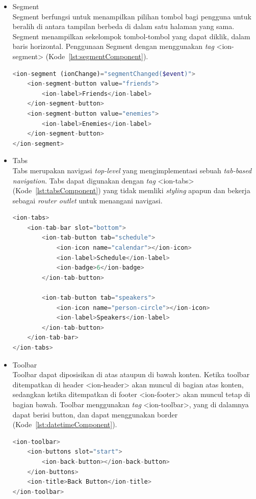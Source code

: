 \begin{itemize}
	\item Segment \\
	Segment berfungsi untuk menampilkan pilihan tombol bagi pengguna untuk beralih di antara tampilan berbeda di dalam satu halaman yang sama. Segment menampilkan sekelompok tombol-tombol yang dapat diklik, dalam baris horizontal. Penggunaan Segment dengan menggunakan {\it tag} <ion-segment> (Kode~\ref{lst:segmentComponent}).
	\begin{lstlisting}[language=php, label={lst:segmentComponent}, caption=Kode Program dari Segment]
<ion-segment (ionChange)="segmentChanged($event)">
	<ion-segment-button value="friends">
		<ion-label>Friends</ion-label>
	</ion-segment-button>
	<ion-segment-button value="enemies">
		<ion-label>Enemies</ion-label>
	</ion-segment-button>
</ion-segment>
	\end{lstlisting}
	
	\item Tabs \\
	Tabs merupakan navigasi {\it top-level} yang mengimplementasi sebuah {\it tab-based navigation}. Tabs dapat digunakan dengan {\it tag} <ion-tabs> (Kode~\ref{lst:tabsComponent}) yang tidak memliki {\it styling} apapun dan bekerja sebagai {\it router outlet} untuk menangani navigasi. 
		\begin{lstlisting}[language=php, label={lst:tabsComponent}, caption=Kode Program dari Tabs]
<ion-tabs>
	<ion-tab-bar slot="bottom">
		<ion-tab-button tab="schedule">
			<ion-icon name="calendar"></ion-icon>
			<ion-label>Schedule</ion-label>
			<ion-badge>6</ion-badge>
		</ion-tab-button>

		<ion-tab-button tab="speakers">
			<ion-icon name="person-circle"></ion-icon>
			<ion-label>Speakers</ion-label>
		</ion-tab-button>
	</ion-tab-bar>
</ion-tabs>
		\end{lstlisting}

	\item Toolbar \\
	Toolbar dapat diposisikan di atas ataupun di bawah konten. Ketika toolbar ditempatkan di header <ion-header> akan muncul di bagian atas konten, sedangkan ketika ditempatkan di footer <ion-footer> akan muncul tetap di bagian bawah. Toolbar menggunakan {\it tag} <ion-toolbar>, yang di dalamnya dapat berisi button, dan dapat menggunakan border (Kode~\ref{lst:datetimeComponent}).
		\begin{lstlisting}[language=php, label={lst:datetimeComponent}, caption=Kode Program dari Toolbar dengan Button di Dalamnya]
<ion-toolbar>
	<ion-buttons slot="start">
		<ion-back-button></ion-back-button>
	</ion-buttons>
	<ion-title>Back Button</ion-title>
</ion-toolbar>
		\end{lstlisting} 
\end{itemize}

